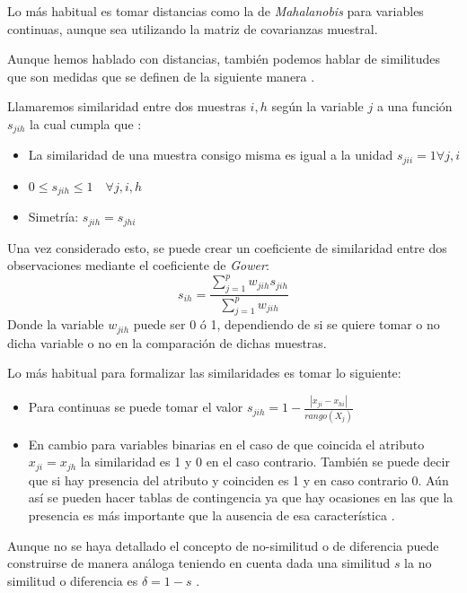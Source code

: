 \noindent Lo más habitual es tomar distancias como la de \emph{Mahalanobis} para variables continuas, aunque sea utilizando la matriz de covarianzas muestral. 

\noindent Aunque hemos hablado con distancias, también podemos hablar de similitudes que son medidas que se definen de la siguiente manera .

\begin{defi}
Llamaremos similaridad entre dos muestras $i,h$ según la variable $j$ a una función $s_{jih}$ la cual cumpla que \cite{Mardia 1979, Peña 2002}:
\begin{itemize}
\item La similaridad de una muestra consigo misma es igual a la unidad $s_{jii}=1 \forall j,i$
\item $0\leq s_{jih} \leq 1\quad \forall j,i,h $
\item Simetría: $s_{jih}=s_{jhi}$
\end{itemize}
\end{defi}

\noindent Una vez considerado esto, se puede crear un coeficiente de similaridad entre dos observaciones mediante el coeficiente de \emph{Gower}\cite{Peña 2002}:
\begin{equation}
s_{ih}=\dfrac{\sum_{j=1}^{p}w_{jih}s_{jih}}{\sum_{j=1}^{p}w_{jih}}
\end{equation}
\noindent Donde la variable $w_{jih}$ puede ser 0 ó 1, dependiendo de si se quiere tomar o no dicha variable o no en la comparación de dichas muestras. 

\noindent Lo más habitual para formalizar las similaridades es tomar lo siguiente:
\begin{itemize}
\item Para continuas se puede tomar el valor $s_{jih}=1-\frac{|x_{ji}-x_{hi}|}{rango(X_j)}$
\item En cambio para variables binarias en el caso de que coincida el atributo $x_{ji}=x_{jh}$ la similaridad es 1 y 0 en el caso contrario. También se puede decir que si hay presencia del atributo y coinciden es 1 y en caso contrario 0. Aún así se pueden hacer tablas de contingencia ya que hay ocasiones en las que la presencia es más importante que la ausencia de esa característica \cite{Johnson 2007}.
\end{itemize}

\noindent Aunque no se haya detallado el concepto de no-similitud o de diferencia puede construirse de manera análoga teniendo en cuenta dada una similitud $s$ la no similitud o diferencia es $\delta=1-s$ \cite{Everitt 2011}.
 
